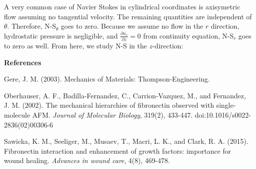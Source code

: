 A very common case of Navier Stokes in cylindrical coordinates is axisymetric flow assuming no tangential velocity. The remaining quantities are independent of $\theta$. Therefore, N-S$_\theta$ goes to zero. Because we assume no flow in the $r$ direction, hydrostatic pressure is negligible, and $\frac{\partial u_z}{\partial z} = 0$ from continuity equation, N-S$_r$ goes to zero as well. From here, we study N-S in the $z$-direction:


\noindent
\textbf{References}
\begingroup
\renewcommand{\section}[2]{}%
\begin{thebibliography}{3}
Gere, J. M. (2003). Mechanics of Materials: Thompson-Engineering.

Oberhauser, A. F., Badilla-Fernandez, C., Carrion-Vazquez, M., and Fernandez, J. M. (2002).
The mechanical hierarchies of fibronectin observed with single-molecule AFM. 
\textit{Journal of Molecular Biology}, 319(2), 433-447. doi:10.1016/s0022-2836(02)00306-6

Sawicka, K. M., Seeliger, M., Musaev, T., Macri, L. K., and Clark, R. A. (2015). Fibronectin
interaction and enhancement of growth factors: importance for wound healing. 
\textit{Advances in wound care}, 4(8), 469-478.

\end{thebibliography}